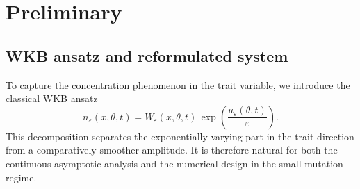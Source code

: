 \documentclass[11pt]{article}
\begin{document}
\section{Preliminary}\label{sec:proliminary}

\subsection{WKB ansatz and reformulated system}

To capture the concentration phenomenon in the trait variable, we introduce the classical WKB ansatz
\begin{equation}\label{eq:WKB}
   n_\varepsilon(x,\theta,t)
   = W_\varepsilon(x,\theta,t)\,
   \exp\!\left(\frac{u_\varepsilon(\theta,t)}{\varepsilon}\right).
\end{equation}
This decomposition separates the exponentially varying part in the trait direction from a comparatively smoother amplitude. It is therefore natural for both the continuous asymptotic analysis and the numerical design in the small-mutation regime.
\end{document}
